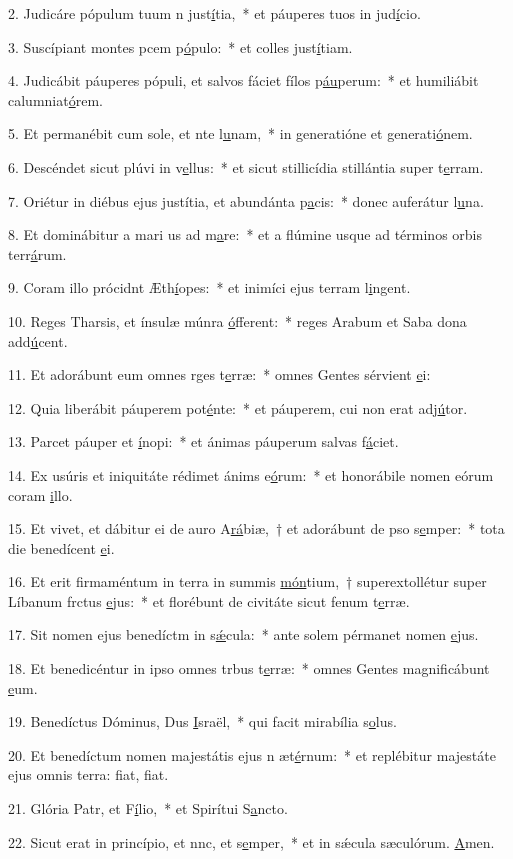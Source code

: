 2. Judicáre pópulum tuum n just\uline{í}tia,~* et páuperes tuos in jud\uline{í}cio.\par 
3. Suscípiant montes pcem p\uline{ó}pulo:~* et colles just\uline{í}tiam.\par 
4. Judicábit páuperes pópuli, et salvos fáciet fílos p\uline{áu}perum:~* et humiliábit calumniat\uline{ó}rem.\par 
5. Et permanébit cum sole, et nte l\uline{u}nam,~* in generatióne et generati\uline{ó}nem.\par 
6. Descéndet sicut plúvi in v\uline{e}llus:~* et sicut stillicídia stillántia super t\uline{e}rram.\par 
7. Oriétur in diébus ejus justítia, et abundánta p\uline{a}cis:~* donec auferátur l\uline{u}na.\par 
8. Et dominábitur a mari us ad m\uline{a}re:~* et a flúmine usque ad términos orbis terr\uline{á}rum.\par 
9. Coram illo prócidnt Æth\uline{í}opes:~* et inimíci ejus terram l\uline{i}ngent.\par 
10. Reges Tharsis, et ínsulæ múnra \uline{ó}fferent:~* reges Arabum et Saba dona add\uline{ú}cent.\par 
11. Et adorábunt eum omnes rges t\uline{e}rræ:~* omnes Gentes sérvient \uline{e}i:\par 
12. Quia liberábit páuperem  pot\uline{é}nte:~* et páuperem, cui non erat adj\uline{ú}tor.\par 
13. Parcet páuper et \uline{í}nopi:~* et ánimas páuperum salvas f\uline{á}ciet.\par 
14. Ex usúris et iniquitáte rédimet ánims e\uline{ó}rum:~* et honorábile nomen eórum coram \uline{i}llo.\par 
15. Et vivet, et dábitur ei de auro A\uline{rá}biæ,~† et adorábunt de pso s\uline{e}mper:~* tota die benedícent \uline{e}i.\par 
16. Et erit firmaméntum in terra in summis \uline{món}tium,~† superextollétur super Líbanum frctus \uline{e}jus:~* et florébunt de civitáte sicut fenum t\uline{e}rræ.\par 
17. Sit nomen ejus benedíctm in s\uline{ǽ}cula:~* ante solem pérmanet nomen \uline{e}jus.\par 
18. Et benedicéntur in ipso omnes trbus t\uline{e}rræ:~* omnes Gentes magnificábunt \uline{e}um.\par 
19. Benedíctus Dóminus, Dus \uline{I}sraël,~* qui facit mirabília s\uline{o}lus.\par 
20. Et benedíctum nomen majestátis ejus n æt\uline{é}rnum:~* et replébitur majestáte ejus omnis terra: fiat, f\uline{i}at.\par 
21. Glória Patr, et F\uline{í}lio,~* et Spirítui S\uline{a}ncto.\par 
22. Sicut erat in princípio, et nnc, et s\uline{e}mper,~* et in sǽcula sæculórum. \uline{A}men.\par 
